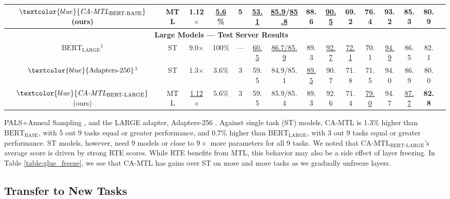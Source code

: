 \documentclass{article} \usepackage{iclr2021_conference,times}
\begin{document}
\begin{table*}[h!]
\begin{center}
\begin{tabular}{|c|c|c|c|c|ccccccccc|c}
        $\textcolor{blue}{\emph{CA-MTL}_{\text{BERT-BASE}}}$ (ours)& MTL & 1.12$\times$ & \underline{5.6} \% & \textbf{5} & \underline{53.1} & \underline{85.9}/\underline{85.8} & 88.6 & \underline{90.5} & 69.2 & 76.4 & 93.2 & 85.3  & \textbf{80.9}  \\
    
        
        \hline
        \multicolumn{14}{|c|}{\textbf{Large Models --- Test Server Results}} \\
        \hline
        
        $\text{BERT}_{\text{LARGE}}$$^{1}$ & ST & 9.0$\times$ & 100\% & --- & \underline{60.5} & \underline{86.7/85.9} & 89.3 & \underline{92.7} & \underline{72.1} & 70.1 & \underline{94.9} & 86.5 & 82.1 \\
        
        $\textcolor{blue}{\text{Adapters-256}}$$^{3}$ & ST & 1.3$\times$ & 3.6\% & 3 & 59.5 & 84.9/85.1 & \underline{89.5} & 90.7 & 71.8 & 71.5 & 94.0 & 86.9 & 80.0 \\
        
        $\textcolor{blue}{\emph{CA-MTL}_{\text{BERT-LARGE}}}$ (ours)& MTL & \underline{1.12}$\times$ & 5.6\% & 3 & 59.5 & 85.9/85.4 & 89.3 & 92.6 & 71.4 & \underline{79.0} & 94.7 & \underline{87.7}  & \textbf{82.8} \\

    \hline
\end{tabular}
\end{center}
\end{table*}
 
 PALS+Anneal Sampling \citep{pmlr-v97-stickland19a}, and the LARGE adapter,
 Adapters-256 \citep{DBLP:journals/corr/abs-1902-00751}. Against single task (ST) models, CA-MTL is 1.3\% higher than $\text{BERT}_{\text{BASE}}$, with 5 out 9 tasks equal or greater performance, and 0.7\% higher than $\text{BERT}_{\text{LARGE}}$, with 3 out 9 tasks equal or greater performance. ST models, however, need 9 models or close to $9\times$ more parameters for all 9 tasks. We noted that $\text{CA-MTL}_{\text{BERT-LARGE}}$'s average score is driven by strong RTE scores. While RTE benefits from MTL, this behavior may also be a side effect of layer freezing. In Table \ref{table:glue_freeze}, we see that CA-MTL has gains over ST on more and more tasks as we gradually unfreeze layers.




\subsection{Transfer to New Tasks}
\label{sec:new_tasks}
\end{document}
